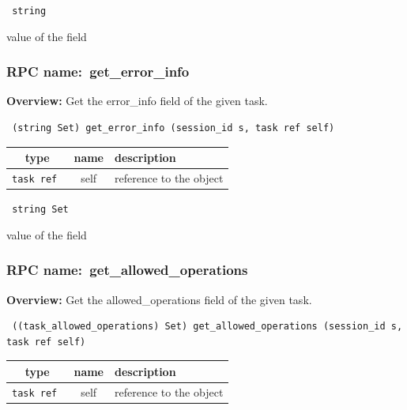 \vspace{0.3cm}

{\tt 
string
}


value of the field
\vspace{0.3cm}
\vspace{0.3cm}
\vspace{0.3cm}
\subsubsection{RPC name:~get\_error\_info}

{\bf Overview:} 
Get the error\_info field of the given task.

\begin{verbatim} (string Set) get_error_info (session_id s, task ref self)\end{verbatim}



 
\vspace{0.3cm}
\begin{tabular}{|c|c|p{7cm}|}
 \hline
{\bf type} & {\bf name} & {\bf description} \\ \hline
{\tt task ref } & self & reference to the object \\ \hline 

\end{tabular}

\vspace{0.3cm}

{\tt 
string Set
}


value of the field
\vspace{0.3cm}
\vspace{0.3cm}
\vspace{0.3cm}
\subsubsection{RPC name:~get\_allowed\_operations}

{\bf Overview:} 
Get the allowed\_operations field of the given task.

\begin{verbatim} ((task_allowed_operations) Set) get_allowed_operations (session_id s, task ref self)\end{verbatim}



 
\vspace{0.3cm}
\begin{tabular}{|c|c|p{7cm}|}
 \hline
{\bf type} & {\bf name} & {\bf description} \\ \hline
{\tt task ref } & self & reference to the object \\ \hline 

\end{tabular}

